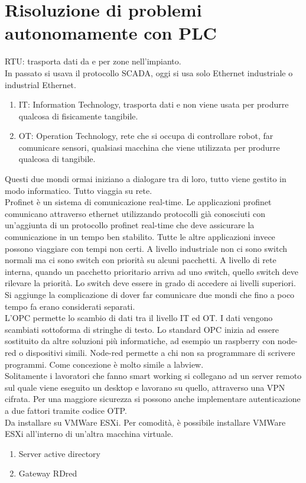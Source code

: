 \documentclass{article}
\begin{document}
    \section{Risoluzione di problemi autonomamente con PLC}
    RTU: trasporta dati da e per zone nell'impianto.
    \\
    In passato si usava il protocollo SCADA, oggi si usa solo Ethernet industriale o industrial Ethernet.
    \\
    \begin{enumerate}
        \item IT: Information Technology, trasporta dati e non viene usata per produrre qualcosa di fisicamente tangibile.
        \item OT: Operation Technology, rete che si occupa di controllare robot, far comunicare sensori, qualsiasi macchina che viene utilizzata per produrre qualcosa di tangibile.
    \end{enumerate}
    Questi due mondi ormai iniziano a dialogare tra di loro, tutto viene gestito in modo informatico. Tutto viaggia su rete.
    \\
    Profinet è un sistema di comunicazione real-time. Le applicazioni profinet comunicano attraverso ethernet utilizzando protocolli già conosciuti con un'aggiunta di un protocollo profinet real-time che deve assicurare la comunicazione in un tempo ben stabilito. Tutte le altre applicazioni invece possono viaggiare con tempi non certi. A livello industriale non ci sono switch normali ma ci sono switch con priorità su alcuni pacchetti. A livello di rete interna, quando un pacchetto prioritario arriva ad uno switch, quello switch deve rilevare la priorità. Lo switch deve essere in grado di accedere ai livelli superiori.
    \\
    Si aggiunge la complicazione di dover far comunicare due mondi che fino a poco tempo fa erano considerati separati.
    \\
    L'OPC permette lo scambio di dati tra il livello IT ed OT. I dati vengono scambiati sottoforma di stringhe di testo. Lo standard OPC inizia ad essere sostituito da altre soluzioni più informatiche, ad esempio un raspberry con node-red o dispositivi simili. Node-red permette a chi non sa programmare di scrivere programmi. Come concezione è molto simile a labview.
    \\
    Solitamente i lavoratori che fanno smart working si collegano ad un server remoto sul quale viene eseguito un desktop e lavorano su quello, attraverso una VPN cifrata. Per una maggiore sicurezza si possono anche implementare autenticazione a due fattori tramite codice OTP.
    \\
    Da installare su VMWare ESXi. Per comodità, è possibile installare VMWare ESXi all'interno di un'altra macchina virtuale.
    \begin{enumerate}
        \item Server active directory
        \item Gateway RDred
    \end{enumerate}
    
\end{document}
